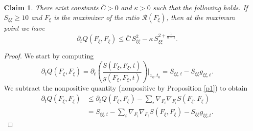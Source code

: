\documentclass[10pt,a4paper]{amsart}
\newtheorem{claim}{Claim}
\newcommand{\maxidx}{\mathord{\xi}} %
\begin{document}
\begin{claim}
There exist constants $\bar C>0$ and $\kappa>0$ such that the following holds. 
If $S_{\maxidx\maxidx}\ge 10$ and $F_{\maxidx}$ is the maximizer of the ratio $\mathcal{R}(F_{\maxidx})$, then at the maximum point we have
\[
\partial_t Q(F_{\maxidx},F_{\maxidx})
\le 
\bar C\, S_{\maxidx\maxidx}^2
-
\kappa\, S_{\maxidx\maxidx}^{2+\frac{1}{n-1}}.
\]
\end{claim}

\begin{proof}
We start by computing
\[
\partial_{t}Q(F_{\maxidx},F_{\maxidx})=\partial_{t}\left(  \frac{S(F_{\maxidx},F_{\maxidx},t)}%
{g(F_{\maxidx},F_{\maxidx},t)}\right)  \Big|_{x_{0},t_{0}}=S_{\maxidx\maxidx,t}-S_{\maxidx\maxidx}g_{\maxidx\maxidx,t}.
\]
We subtract the {nonpositive} quantity (nonpositive by Proposition \ref{p1}) to obtain
\begin{align*}
\partial_{t}Q(F_{\maxidx},F_{\maxidx})  & \leq\partial_{t}Q(F_{\maxidx},F_{\maxidx})-\sum_{i}%
\nabla_{F_{i}}\nabla_{F_{i}}S(F_{\maxidx},F_{\maxidx})\\
&  =S_{\maxidx\maxidx,t}-\sum_{i}\nabla_{F_{i}}\nabla_{F_{i}}S(F_{\maxidx},F_{\maxidx})-S_{\maxidx\maxidx}%
g_{\maxidx\maxidx,t}.
\end{align*}


\end{proof}
\end{document}

